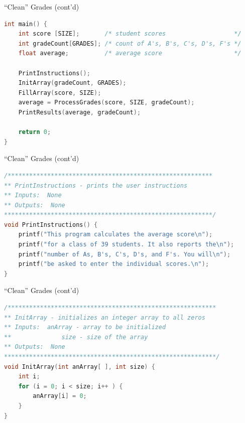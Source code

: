 \documentclass[graphics]{beamer}
\begin{document}
\begin{frame}[fragile]{``Clean'' Grades (cont'd)}
    \begin{lstlisting}[language=C,basicstyle=\scriptsize,keywordstyle=\color{blue},commentstyle=\color{green},showstringspaces=false,stringstyle=\color{red}]
int main() {
    int score [SIZE];       /* student scores                   */
    int gradeCount[GRADES]; /* count of A's, B's, C's, D's, F's */
    float average;          /* average score                    */
    
    PrintInstructions();
    InitArray(gradeCount, GRADES);
    FillArray(score, SIZE);
    average = ProcessGrades(score, SIZE, gradeCount);
    PrintResults(average, gradeCount);

    return 0;
}
    \end{lstlisting}
\end{frame}

\begin{frame}[fragile]{``Clean'' Grades (cont'd)}
    \begin{lstlisting}[language=C,basicstyle=\scriptsize,keywordstyle=\color{blue},commentstyle=\color{green},showstringspaces=false,stringstyle=\color{red}]
/*********************************************************
** PrintInstructions - prints the user instructions
** Inputs:  None
** Outputs:  None
**********************************************************/
void PrintInstructions() {
    printf("This program calculates the average score\n");
    printf("for a class of 39 students. It also reports the\n");
    printf("number of As, B's, C's, D's, and F's. You will\n");
    printf("be asked to enter the individual scores.\n");
}
    \end{lstlisting}
\end{frame}

\begin{frame}[fragile]{``Clean'' Grades (cont'd)}
    \begin{lstlisting}[language=C,basicstyle=\scriptsize,keywordstyle=\color{blue},commentstyle=\color{green},showstringspaces=false,stringstyle=\color{red}]
/**********************************************************
** InitArray - initializes an integer array to all zeros
** Inputs:  anArray - array to be initialized
**              size - size of the array
** Outputs:  None
***********************************************************/
void InitArray(int anArray[ ], int size) {
    int i;
    for (i = 0; i < size; i++ ) {
        anArray[i] = 0;
    }
}    
    \end{lstlisting}
\end{frame}
\end{document}
